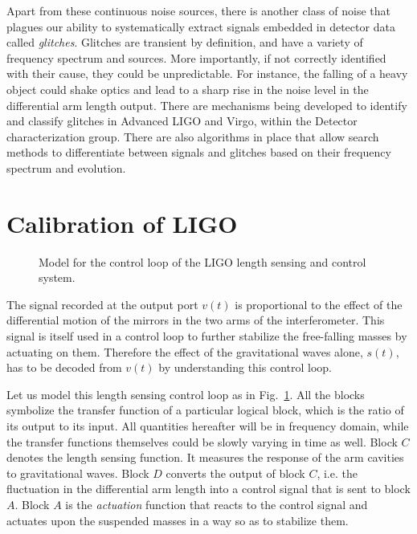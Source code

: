 Apart from these continuous noise sources, there is another class of noise 
that plagues our ability to systematically extract signals embedded in detector
data called {\it glitches}. Glitches are transient by definition, and have a 
variety of frequency spectrum and sources. More importantly, if not correctly 
identified with their cause, they could be unpredictable. For instance, the 
falling of a 
heavy object could shake optics and lead to a sharp rise in the noise level
in the differential arm length output. There are mechanisms being developed to 
identify and classify glitches in Advanced LIGO and Virgo, within the Detector
characterization group. There are also algorithms in place that allow search 
methods to differentiate between signals and glitches based on their frequency
spectrum and evolution.


\section{Calibration of LIGO}\label{sec:ligo_calibration}
\begin{figure}
 \begin{center}
 \end{center}
\caption{\label{fig:ligo_calibration}Model for the control loop of the LIGO
length sensing and control system.}
\end{figure}

The signal recorded at the output port $v(t)$ is proportional to the effect of 
the differential motion of the mirrors in the two arms of the interferometer.
This signal is itself used in a control loop to further stabilize the free-falling
masses by actuating on them. Therefore the effect of the gravitational waves alone, 
$s(t)$, has to be decoded from $v(t)$ by understanding this control loop.

Let us model this length sensing control loop as in
Fig.~\ref{fig:ligo_calibration}. All the blocks symbolize the transfer function
of a particular logical block, which is the ratio of its output to its input.
All quantities hereafter will be in frequency domain, while the transfer 
functions themselves could be slowly varying in time as well. 
Block $C$ denotes the 
length sensing function. It measures the response of the arm cavities to 
gravitational waves. Block $D$ converts the output of block $C$, i.e. the 
fluctuation in the differential arm length into a control signal that is sent
to block $A$. Block $A$ is the {\it actuation} function that reacts to the 
control signal and actuates upon the suspended masses in a way so as to 
stabilize them. 

